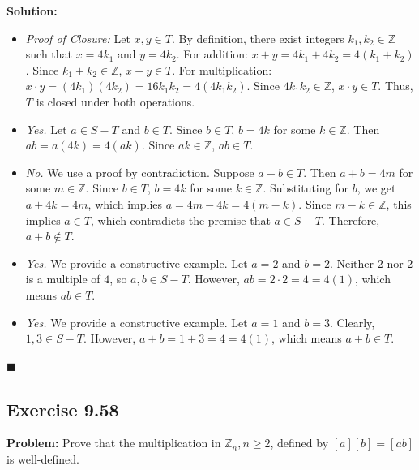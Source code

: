 \documentclass[11pt, a4paper]{article}
\theoremstyle{definition}
\theoremstyle{remark}
\newcommand{\Z}{\mathbb{Z}}
\begin{document}
\textbf{Solution:}
\begin{itemize}
    \item[(a)] \textit{Proof of Closure:} Let $x, y \in T$. By definition, there exist integers $k_1, k_2 \in \Z$ such that $x = 4k_1$ and $y = 4k_2$. 
    For addition: $x + y = 4k_1 + 4k_2 = 4(k_1 + k_2)$. Since $k_1 + k_2 \in \Z$, $x + y \in T$.
    For multiplication: $x \cdot y = (4k_1)(4k_2) = 16k_1k_2 = 4(4k_1k_2)$. Since $4k_1k_2 \in \Z$, $x \cdot y \in T$. Thus, $T$ is closed under both operations.
    
    \item[(b)] \textit{Yes.} Let $a \in S - T$ and $b \in T$. Since $b \in T$, $b = 4k$ for some $k \in \Z$. Then $ab = a(4k) = 4(ak)$. Since $ak \in \Z$, $ab \in T$.
    
    \item[(c)] \textit{No.} We use a proof by contradiction. Suppose $a+b \in T$. Then $a+b = 4m$ for some $m \in \Z$. Since $b \in T$, $b = 4k$ for some $k \in \Z$. Substituting for $b$, we get $a + 4k = 4m$, which implies $a = 4m - 4k = 4(m - k)$. Since $m - k \in \Z$, this implies $a \in T$, which contradicts the premise that $a \in S - T$. Therefore, $a+b \notin T$.
    
    \item[(d)] \textit{Yes.} We provide a constructive example. Let $a = 2$ and $b = 2$. Neither $2$ nor $2$ is a multiple of $4$, so $a, b \in S - T$. However, $ab = 2 \cdot 2 = 4 = 4(1)$, which means $ab \in T$.
    
    \item[(e)] \textit{Yes.} We provide a constructive example. Let $a = 1$ and $b = 3$. Clearly, $1, 3 \in S - T$. However, $a + b = 1 + 3 = 4 = 4(1)$, which means $a+b \in T$.
\end{itemize}
\hfill $\blacksquare$

\subsection{Exercise 9.58}
\textbf{Problem:} Prove that the multiplication in $\Z_n, n \ge 2$, defined by $[a][b] = [ab]$ is well-defined.
\end{document}
